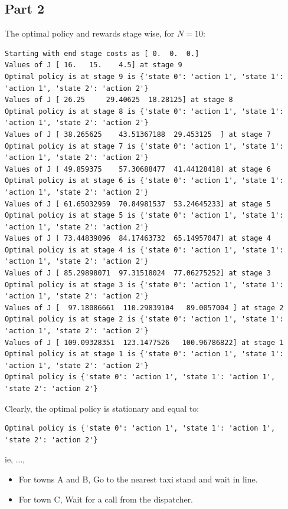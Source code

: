 \subsection{Part 2}

The optimal policy and rewards stage wise, for $N=10$:

\begin{lstlisting}[numbers = none]
Starting with end stage costs as [ 0.  0.  0.]
Values of J [ 16.   15.    4.5] at stage 9
Optimal policy is at stage 9 is {'state 0': 'action 1', 'state 1': 'action 1', 'state 2': 'action 2'}
Values of J [ 26.25     29.40625  18.28125] at stage 8
Optimal policy is at stage 8 is {'state 0': 'action 1', 'state 1': 'action 1', 'state 2': 'action 2'}
Values of J [ 38.265625    43.51367188  29.453125  ] at stage 7
Optimal policy is at stage 7 is {'state 0': 'action 1', 'state 1': 'action 1', 'state 2': 'action 2'}
Values of J [ 49.859375    57.30688477  41.44128418] at stage 6
Optimal policy is at stage 6 is {'state 0': 'action 1', 'state 1': 'action 1', 'state 2': 'action 2'}
Values of J [ 61.65032959  70.84981537  53.24645233] at stage 5
Optimal policy is at stage 5 is {'state 0': 'action 1', 'state 1': 'action 1', 'state 2': 'action 2'}
Values of J [ 73.44839096  84.17463732  65.14957047] at stage 4
Optimal policy is at stage 4 is {'state 0': 'action 1', 'state 1': 'action 1', 'state 2': 'action 2'}
Values of J [ 85.29898071  97.31518024  77.06275252] at stage 3
Optimal policy is at stage 3 is {'state 0': 'action 1', 'state 1': 'action 1', 'state 2': 'action 2'}
Values of J [  97.18086661  110.29839104   89.0057004 ] at stage 2
Optimal policy is at stage 2 is {'state 0': 'action 1', 'state 1': 'action 1', 'state 2': 'action 2'}
Values of J [ 109.09328351  123.1477526   100.96786822] at stage 1
Optimal policy is at stage 1 is {'state 0': 'action 1', 'state 1': 'action 1', 'state 2': 'action 2'}
Optimal policy is {'state 0': 'action 1', 'state 1': 'action 1', 'state 2': 'action 2'}
\end{lstlisting}

Clearly, the optimal policy is stationary and equal to:
\begin{lstlisting}[numbers = none]
Optimal policy is {'state 0': 'action 1', 'state 1': 'action 1', 'state 2': 'action 2'}
\end{lstlisting}

ie, ...,

\begin{itemize}
\item For towns A and B, Go to the nearest taxi stand and wait in line.
\item For town C, Wait for a call from the dispatcher.
\end{itemize}

